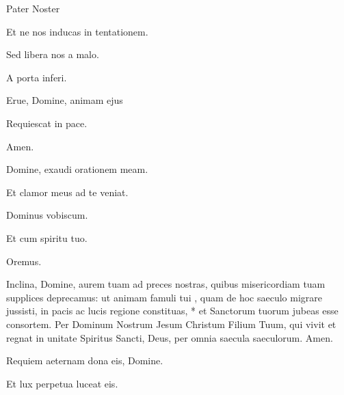 Pater Noster 

\rubric{\Vbar} Et ne nos inducas in tentationem.

\rubric{\Rbar} Sed libera nos a malo.

\rubric{\Vbar} A porta inferi.

\rubric{\Rbar} Erue, Domine, animam ejus

\rubric{\Vbar} Requiescat in pace.

\rubric{\Rbar} Amen.

\rubric{\Vbar} Domine, exaudi orationem meam.

\rubric{\Rbar} Et clamor meus ad te veniat.

\rubric{\Vbar} Dominus vobiscum.

\rubric{\Rbar} Et cum spiritu tuo.

Oremus.

Inclina, Domine, aurem tuam ad preces nostras, quibus misericordiam tuam supplices deprecamus: \grecross ut animam famuli tui , quam de hoc saeculo migrare jussisti, in pacis ac lucis regione constituas, * et Sanctorum tuorum jubeas esse consortem. Per Dominum Nostrum Jesum Christum Filium Tuum, qui vivit et regnat in unitate Spiritus Sancti, Deus, per omnia saecula saeculorum. \rubric{\Rbar} Amen.

\rubric{\Vbar} Requiem aeternam dona eis, Domine.

\rubric{\Rbar} Et lux perpetua luceat eis.